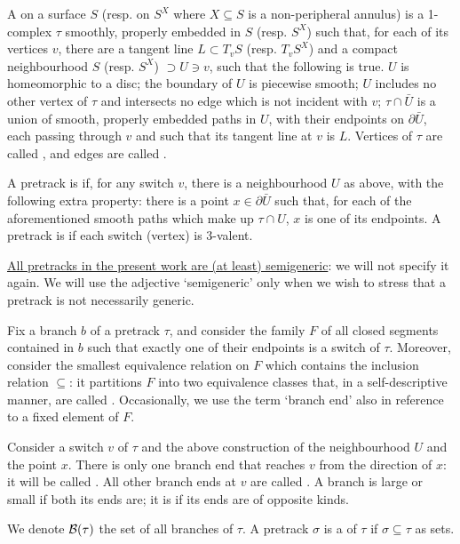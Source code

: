 \begin{defin}\label{def:pretrack}
A  on a surface $S$ (resp. on $S^X$ where $X\subseteq S$ is a non-peripheral annulus) is a 1-complex $\tau$ smoothly, properly embedded in $S$ (resp. $S^X$) such that, for each of its vertices $v$, there are a tangent line $L\subset T_vS$ (resp. $T_vS^X$) and a compact neighbourhood $S$ (resp. $S^X$) $\supset U\ni v$, such that the following is true. $U$ is homeomorphic to a disc; the boundary of $U$ is piecewise smooth; $U$ includes no other vertex of $\tau$ and intersects no edge which is not incident with $v$; $\tau\cap\bar U$ is a union of smooth, properly embedded paths in $U$, with their endpoints on $\partial\bar U$, each passing through $v$ and such that its tangent line at $v$ is $L$. Vertices of $\tau$ are called , and edges are called . 

A pretrack is  if, for any switch $v$, there is a neighbourhood $U$ as above, with the following extra property: there is a point $x\in\partial\bar U$ such that, for each of the aforementioned smooth paths which make up $\tau\cap U$, $x$ is one of its endpoints. A pretrack is  if each switch (vertex) is $3$-valent.

\ul{All pretracks in the present work are (at least) semigeneric}: we will not specify it again. We will use the adjective `semigeneric' only when we wish to stress that a pretrack is not necessarily generic.

Fix a branch $b$ of a pretrack $\tau$, and consider the family $F$ of all closed segments contained in $b$ such that exactly one of their endpoints is a switch of $\tau$. Moreover, consider the smallest equivalence relation on $F$ which contains the inclusion relation $\subseteq$: it partitions $F$ into two equivalence classes that, in a self-descriptive manner, are called . Occasionally, we use the term `branch end' also in reference to a fixed element of $F$. 

Consider a switch $v$ of $\tau$ and the above construction of the neighbourhood $U$ and the point $x$. There is only one branch end that reaches $v$ from the direction of $x$: it will be called . All other branch ends at $v$ are called . A branch is large or small if both its ends are; it is  if its ends are of opposite kinds.

We denote $\mathcal B(\tau)$ the set of all branches of $\tau$. A pretrack $\sigma$ is a  of $\tau$ if $\sigma\subseteq \tau$ as sets.
\end{defin}


